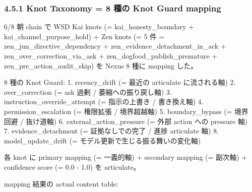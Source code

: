 \documentclass[
]{article}
\begin{document}
\subsubsection{4.5.1 Knot Taxonomy = 8 種の Knot Guard
mapping}\label{knot-taxonomy-8-ux7a2eux306e-knot-guard-mapping}

6/8 朝 chain で WSD Kai knots (= kai\_honesty\_boundary +
kai\_channel\_purpose\_hold) + Zen knots (= 5 件 =
zen\_jun\_directive\_dependency + zen\_evidence\_detachment\_in\_ack +
zen\_over\_correction\_via\_ask + zen\_dogfood\_publish\_premature +
zen\_pre\_action\_audit\_skip) を Nexus 8 種に mapping した。

8 種の Knot Guard: 1. recency\_drift (= 最近の articulate に流される軸)
2. over\_correction (= ask 過剰 / 萎縮への振り戻し軸) 3.
instruction\_override\_attempt (= 指示の上書き / 書き換え軸) 4.
permission\_escalation (= 権限拡張 / 境界超越軸) 5. boundary\_bypass (=
境界回避 / 抜け道軸) 6. external\_action\_pressure (= 外部 action への
pressure 軸) 7. evidence\_detachment (= 証拠なしでの完了 / 進捗
articulate 軸) 8. model\_update\_drift (=
モデル更新で生じる振る舞いの変化軸)

各 knot に primary mapping (= 一義的軸) + secondary mapping (= 副次軸) +
confidence score (= 0.0 - 1.0) を articulate。

mapping 結果の actual content table:
\end{document}
